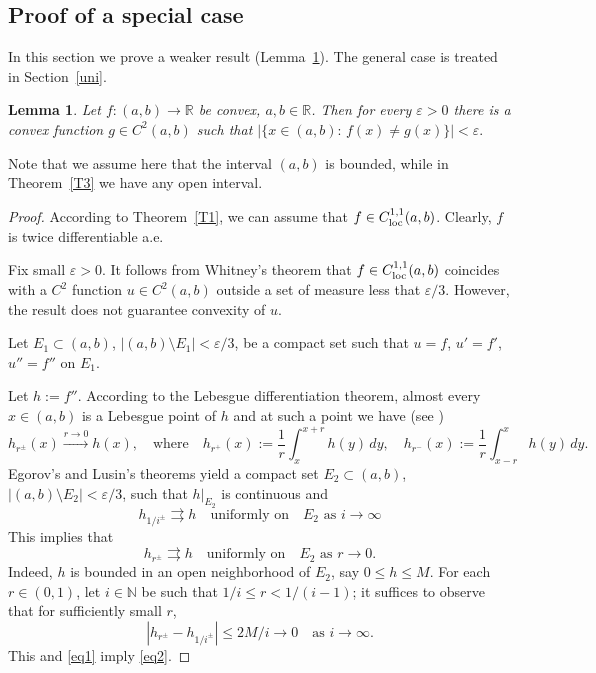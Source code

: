 \documentclass[intlimits,12pt,reqno]{amsart}
\newcommand{\bbbr}{\mathbb R}
\newcommand{\bbbn}{\mathbb N}
\newcommand{\eps}{\varepsilon}
\newtheorem{lemma}[theorem]{Lemma}
\theoremstyle{definition}
\begin{document}
\subsection{Proof of a special case}
In this section we prove a weaker result (Lemma~\ref{T9}). The general case is treated in Section~\ref{uni}.
\begin{lemma}
\label{T9}
Let $f:(a,b)\to\bbbr$ be convex, $a,b\in\bbbr$. Then for every $\eps>0$  there is a convex function $g\in C^2(a,b)$ such that
$
|\{x\in (a,b):\, f(x)\neq g(x)\}|<\eps.
$
\end{lemma}
Note that we assume here that the interval $(a,b)$ is bounded, while in Theorem~\ref{T3} we have any open interval.
\begin{proof}
According to Theorem~\ref{T1}, we can assume that $f\in C^{1,1}_{\rm loc}(a,b)$. Clearly, $f$ is twice differentiable a.e.

Fix small $\eps>0$.
It follows from Whitney's theorem \cite[Theorem~4]{whitney} that  $f\in C^{1,1}_{\rm loc}(a,b)$ coincides with a $C^2$ function $u\in C^2(a,b)$ outside a set of measure less that $\eps/3$. However, the result does not guarantee convexity of $u$.

Let $E_1\subset (a,b)$, $|(a,b)\setminus E_1|<\eps/3$, be a compact set such that $u=f$, $u'=f'$, $u''=f''$ on $E_1$.

Let $h:=f''$. According to the Lebesgue differentiation theorem, almost every $x\in (a,b)$ is a Lebesgue point of $h$ and at such  a point we have (see \cite[p.\ 11]{stein})
\begin{equation}
\label{eq3}
h_{r^{\pm}}(x)\stackrel{r\to 0}{\longrightarrow} h(x),
\quad
\text{where}
\quad
h_{r^+}(x):=\frac{1}{r}\int_{x}^{x+r} h(y)\, dy,
\quad
h_{r^-}(x):=\frac{1}{r}\int_{x-r}^{x} h(y)\, dy.
\end{equation}
Egorov's and Lusin's theorems yield a compact set $E_2\subset (a,b)$, $|(a,b)\setminus E_2|<\eps/3$, such that $h|_{E_2}$ is continuous and
\begin{equation}
\label{eq1}
h_{1/i^\pm}\rightrightarrows h
\quad
\text{uniformly on}
\quad
E_2 \text{ as } i\to\infty
\end{equation}
This implies that
\begin{equation}
\label{eq2}
h_{r^\pm}\rightrightarrows h
\quad
\text{uniformly on}
\quad
E_2 \text{ as } r\to 0.
\end{equation}
Indeed, $h$ is bounded in an open neighborhood of $E_2$, say $0\leq h\leq M$. For each $r\in (0,1)$, let $i\in \bbbn$ be such that $1/i\leq r<1/(i-1)$; it suffices to observe that for sufficiently small $r$,
$$
|h_{r^\pm}-h_{1/i^\pm}|\leq 2M/i\to 0
\quad
\text{as } i\to\infty.
$$
This and \eqref{eq1} imply \eqref{eq2}.


\end{proof}
\end{document}

